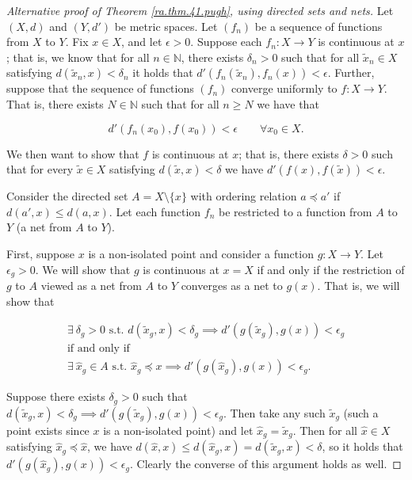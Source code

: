 \begin{proof}[Alternative proof of Theorem \ref{ra.thm.41.pugh}, using directed sets and nets]




Let \((X, d)\) and \((Y, d')\) be metric spaces. Let \((f_n)\) be a sequence of functions from  \(X\) to \( Y\). Fix \(x \in X\), and let \(\epsilon > 0\). Suppose each \(f_n: X \to Y\) is continuous at \(x \); that is, we know that for all \(n \in \mathbb{N}\), there exists \(\delta_n > 0\) such that for all \(\tilde{x}_n \in X\) satisfying \(d(\tilde{x}_n, x) < \delta_n\) it holds that \(d'(f_n(\tilde{x}_n), f_n(x)) < \epsilon\). Further, suppose that the sequence of functions \((f_n)\) converge uniformly to \(f: X \to Y\). That is, there exists \(N \in \mathbb{N}\) such that for all \(n \geq N\) we have that

\begin{equation}\label{ra.425b.hw2.2.c.1}
d'(f_n(x_0) , f(x_0)) < \epsilon \qquad \forall x_0 \in X.
\end{equation}

 We then want to show that \(f\) is continuous at \(x\); that is, there exists \(\delta >0 \) such that for every \(\tilde{x} \in X\) satisfying \(d(\tilde{x}, x) < \delta\) we have \(d'(f(x), f(\tilde{x})) < \epsilon\).  
 
 Consider the directed set \(A = X \setminus \{x\}\) with ordering relation \(a \preceq a'\) if \(d(a', x) \leq d(a, x)\). Let each function \(f_n\) be restricted to a function from \(A\) to \(Y\) (a net from \(A\) to \(Y\)). 
 
 
First, suppose \(x\) is a non-isolated point and consider a function \(g: X \to Y\). Let \(\epsilon_g >0 \). We will show that \(g\) is continuous at \(x = X\) if and only if the restriction of \(g\) to \(A\) viewed as a net from \(A\) to \(Y\) converges as a net to \(g(x)\). That is, we will show that 
 
 \begin{multline*}
 \exists \ \delta_g > 0  \text{ s.t. } d(\tilde{x}_g, x) < \delta_g \implies d'(g(\tilde{x}_g), g(x)) < \epsilon_g 
\\ \text{if and only if}
\\  \exists \ \hat{x}_g \in A  \text{ s.t. } \hat{x}_g \preceq x \implies d'(g(\hat{x}_g), g(x)) < \epsilon_g. 
 \end{multline*}
 
Suppose there exists \(\delta_g > 0\) such that \(d(\tilde{x}_g, x) < \delta_g \implies d'(g(\tilde{x}_g), g(x)) < \epsilon_g \). Then take any such \(\tilde{x}_g\) (such a point exists since \(x\) is a non-isolated point) and let \(\hat{x}_g = \tilde{x}_g\). Then for all \(\hat{x} \in X\) satisfying \(\hat{x}_g \preceq \hat{x}\), we have \(d(\hat{x}, x) \leq d(\hat{x}_g, x) = d(\tilde{x}_g, x) < \delta\), so it holds that \(d'(g(\hat{x}_g), g(x)) < \epsilon_g\). Clearly the converse of this argument holds as well.


\end{proof}
